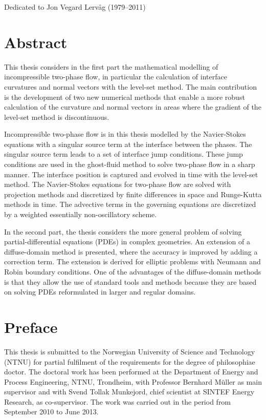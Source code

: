 \documentclass[11pt,b5paper,DIV=calc,BCOR1.3cm,headings=small,%
               footinclude=false,headsepline]{scrbook}
\begin{document}
\thispagestyle{empty}
\vspace*{7cm}
\begin{center}
  Dedicated to Jon Vegard Lervåg (1979--2011)
\end{center}

\chapter*{Abstract}

This thesis considers in the first part the mathematical modelling of
incompressible two-phase flow, in particular the calculation of interface
curvatures and normal vectors with the level-set method.  The main contribution
is the development of two new numerical methods that enable a more robust
calculation of the curvature and normal vectors in areas where the gradient
of the level-set method is discontinuous.

Incompressible two-phase flow is in this thesis modelled by the Navier-Stokes
equations with a singular source term at the interface between the phases.  The
singular source term leads to a set of interface jump conditions.  These jump
conditions are used in the ghost-fluid method to solve two-phase flow in
a sharp manner.  The interface position is captured and evolved in time with
the level-set method.  The Navier-Stokes equations for two-phase flow are
solved with projection methods and discretized by finite differences in space
and Runge-Kutta methods in time.  The advective terms in the governing
equations are discretized by a weighted essentially non-oscillatory scheme.

In the second part, the thesis considers the more general problem of solving
partial-differential equations (PDEs) in complex geometries.  An extension of
a diffuse-domain method is presented, where the accuracy is improved by adding
a correction term.  The extension is derived for elliptic problems with Neumann
and Robin boundary conditions.  One of the advantages of the diffuse-domain
methods is that they allow the use of standard tools and methods because they
are based on solving PDEs reformulated in larger and regular domains.

\chapter*{Preface}

This thesis is submitted to the Norwegian University of Science and Technology
(NTNU) for partial fulfilment of the requirements for the degree of
philosophiae doctor.  The doctoral work has been performed at the Department of
Energy and Process Engineering, NTNU, Trondheim, with Professor Bernhard Müller
as main supervisor and with Svend Tollak Munkejord, chief scientist at SINTEF
Energy Research, as co-supervisor.  The work was carried out in the period from
September 2010 to June 2013.
\end{document}

